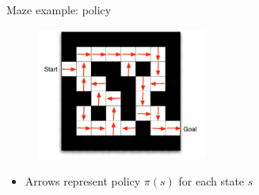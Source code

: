 \bgroup
\begin{frame}{Maze example: policy}
\begin{figure}
\centering
\includegraphics[width=0.5\textwidth]{img/maze_policy.pdf}
\end{figure}
\begin{itemize}
\item Arrows represent policy $\pi(s)$ for each state $s$
\end{itemize}
\end{frame}
\egroup